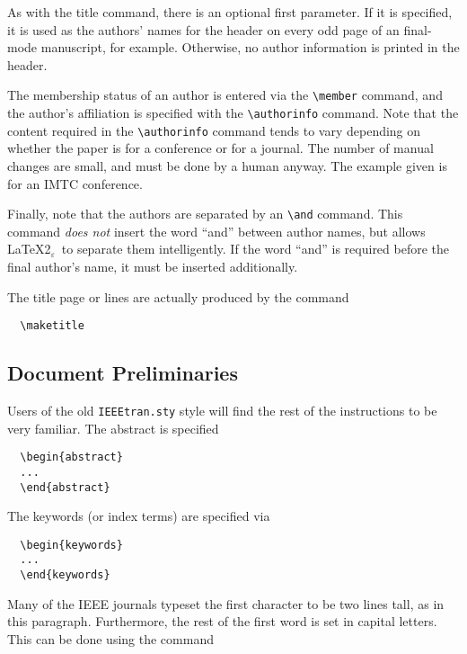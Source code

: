 \documentclass[%
	final,
	notitlepage,
	narroweqnarray,
	inline,
	twoside,
	]{ieee}
\newcommand{\latexiie}{\LaTeX2{\Large$_\varepsilon$}}
\begin{document}
As with the title command, there is an optional first parameter. If it
is specified, it is used as the authors' names for the header on every
odd page of an final-mode manuscript, for example.  Otherwise, no
author information is printed in the header.

The membership status of an author is entered via the 
\verb|\member| command, and the author's affiliation is specified
with the \verb|\authorinfo| command.  Note that the content required
in the \verb|\authorinfo| command tends to vary depending on whether
the paper is for a conference or for a journal. The number of manual
changes are small, and must be done by a human anyway. The example
given is for an IMTC conference.

Finally, note that the authors are separated by an \verb|\and|
command.  This command \emph{does not} insert the word ``and'' between
author names, but allows \latexiie\ to separate them intelligently. If
the word ``and'' is required before the final author's name, it must
be inserted additionally.

The title page or lines are actually produced by the command
\begin{verbatim}
  \maketitle
\end{verbatim}

\subsection{Document Preliminaries}

Users of the old \texttt{IEEEtran.sty} style will find the rest of the
instructions to be very familiar. The abstract is specified
\begin{verbatim}
  \begin{abstract} 
  ...
  \end{abstract}
\end{verbatim}
The keywords (or index terms) are specified via
\begin{verbatim}
  \begin{keywords}
  ...
  \end{keywords}
\end{verbatim}

\PARstart Many of the IEEE journals typeset the first character to be
two lines tall, as in this paragraph. Furthermore, the rest of the
first word is set in capital letters. This can be done using the
command
\end{document}
